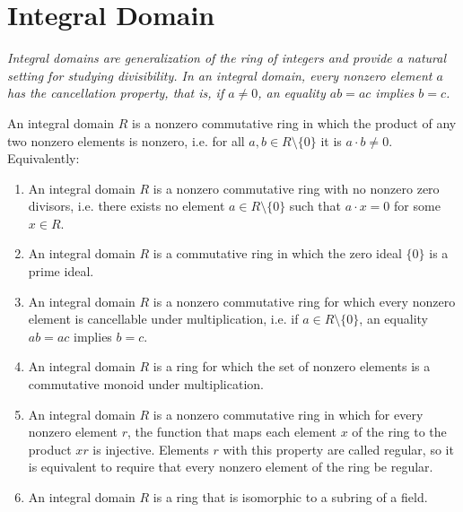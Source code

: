\documentclass[a4paper]{book}
\theoremstyle{break}
\theoremstyle{plain}
\begin{document}
\newpage

\section{Integral Domain}

\textit{Integral domains are generalization of the ring of integers and provide a natural setting for studying divisibility. In an integral domain, every nonzero element \(a\) has the cancellation property, that is, if \(a \neq 0\), an equality \(ab = ac\) implies \(b = c\).}

\begin{definition}
    An {\color{maththen}integral domain} \(R\) is a {\color{mathif}nonzero commutative ring} in which the product of any two nonzero elements is nonzero, i.e. for all \(a, b \in R \setminus \{0\}\) it is \(a \cdot b \neq 0\). Equivalently:
    \begin{enumerate}
        \item An {\color{maththen}integral domain} \(R\) is a {\color{mathif}nonzero commutative ring} with no nonzero {\color{mathif}zero divisors}, i.e. there exists no element \(a \in R \setminus \{0\}\) such that \(a \cdot x = 0\) for some \(x \in R\).
        \item An {\color{maththen}integral domain} \(R\) is a {\color{mathif}commutative ring} in which the {\color{mathif}zero ideal} \(\{0\}\) is a {\color{mathif}prime ideal}.
        \item An {\color{maththen}integral domain} \(R\) is a {\color{mathif}nonzero commutative ring} for which every nonzero element is {\color{mathif}cancellable under multiplication}, i.e. if \(a \in R \setminus \{0\}\), an equality \(ab = ac\) implies \(b = c\).
        \item An {\color{maththen}integral domain} \(R\) is a {\color{mathif}ring} for which the {\color{mathif}set of nonzero elements} is a {\color{mathif}commutative monoid} under multiplication.
        \item An {\color{maththen}integral domain} \(R\) is a {\color{mathif}nonzero commutative ring} in which for every nonzero element \(r\), the {\color{mathif}function} that maps each element \(x\) of the ring to the product \(xr\) is {\color{mathif}injective}. Elements \(r\) with this property are called {\color{mathrem}regular}, so it is equivalent to require that every nonzero element of the ring be regular.
        \item An {\color{maththen}integral domain} \(R\) is a {\color{mathif}ring} that is {\color{mathif}isomorphic} to a {\color{mathif}subring} of a {\color{mathif}field}.
    \end{enumerate}
\end{definition}
\end{document}
